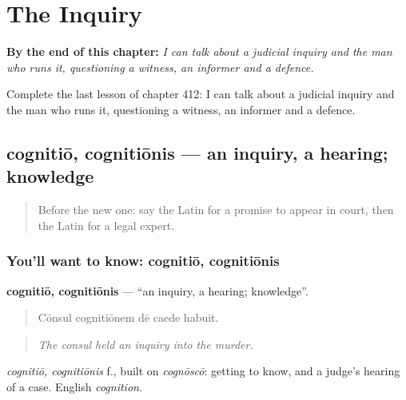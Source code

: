 
\chapter{The Inquiry}
\label{ch:la-the-inquiry}

\begin{chapteropening}
\textbf{By the end of this chapter:} \emph{I can talk about a judicial inquiry and the man who runs it, questioning a witness, an informer and a defence.}

Complete the last lesson of chapter 412: I can talk about a judicial inquiry and the man who runs it, questioning a witness, an informer and a defence.
\end{chapteropening}

\section[cognitiō, cognitiōnis]{cognitiō, cognitiōnis — an inquiry, a hearing; knowledge}

\label{lesson:LA-C412-cognitio}



\begin{quote}
Before the new one: say the Latin for a promise to appear in court, then the Latin for a legal expert.
\end{quote}

\subsection*{You'll want to know: cognitiō, cognitiōnis}
\textbf{cognitiō, cognitiōnis} — \textquotedblleft{}an inquiry, a hearing; knowledge\textquotedblright{}.

\begin{quote}
Cōnsul cognitiōnem dē caede habuit.
\end{quote}

\begin{quote}
\emph{The consul held an inquiry into the murder.}
\end{quote}

\emph{cognitiō, cognitiōnis} f., built on \emph{cognōscō}: getting to know, and a judge's hearing of a case. English \emph{cognition}.

